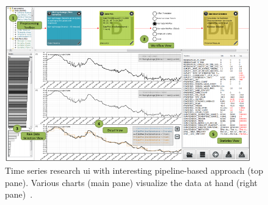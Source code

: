 \begin{figure}
  \centering
  \includegraphics[width=0.95\textwidth]{figures/state-of-the-art/time-series-research}
  \caption{Time series research \gls{ui} with interesting pipeline-based approach (top pane). Various charts (main pane) visualize the data at hand (right pane)~\cite{Bernard2012}.}
  \label{fig:time-series-research-screenshot}
\end{figure}

